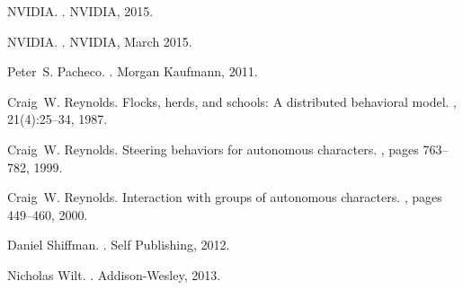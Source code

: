 \documentclass[journal,transmag]{IEEEtran}
\begin{document}
\begin{thebibliography}{1}
NVIDIA.
.
\newblock NVIDIA, 2015.

NVIDIA.
.
\newblock NVIDIA, March 2015.

Peter~S. Pacheco.
.
\newblock Morgan Kaufmann, 2011.

Craig~W. Reynolds.
\newblock Flocks, herds, and schools: A distributed behavioral model.
, 21(4):25--34, 1987.

Craig~W. Reynolds.
\newblock Steering behaviors for autonomous characters.
, pages
  763--782, 1999.

Craig~W. Reynolds.
\newblock Interaction with groups of autonomous characters.
,
  pages 449--460, 2000.

Daniel Shiffman.
.
\newblock Self Publishing, 2012.

Nicholas Wilt.
.
\newblock Addison-Wesley, 2013.

\end{thebibliography}

%






\end{document}
